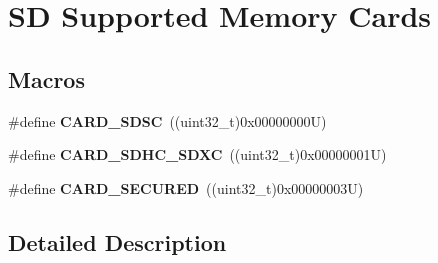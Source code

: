 \hypertarget{group___s_d___exported___constansts___group3}{}\section{SD Supported Memory Cards}
\label{group___s_d___exported___constansts___group3}
\subsection*{Macros}
\begin{DoxyCompactItemize}
\item 
\mbox{\label{group___s_d___exported___constansts___group3_ga1e37fb8ed6580c183599703ed2585a10}} 
\#define {\bfseries C\+A\+R\+D\+\_\+\+S\+D\+SC}~((uint32\+\_\+t)0x00000000\+U)
\item 
\mbox{\label{group___s_d___exported___constansts___group3_ga0651bae30a3678dc6b76356f80846ace}} 
\#define {\bfseries C\+A\+R\+D\+\_\+\+S\+D\+H\+C\+\_\+\+S\+D\+XC}~((uint32\+\_\+t)0x00000001\+U)
\item 
\mbox{\label{group___s_d___exported___constansts___group3_gac39f7eb4fe86233699b8b055e95af9e6}} 
\#define {\bfseries C\+A\+R\+D\+\_\+\+S\+E\+C\+U\+R\+ED}~((uint32\+\_\+t)0x00000003\+U)
\end{DoxyCompactItemize}


\subsection{Detailed Description}
